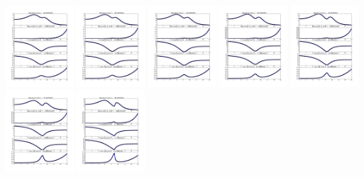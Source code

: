 \documentclass[11pt]{article}
\begin{document}
\vskip 10pt 
\includegraphics[width=0.19\textwidth]{frame0055fig1.png}
\vskip 10pt 
\includegraphics[width=0.19\textwidth]{frame0056fig1.png}
\vskip 10pt 
\includegraphics[width=0.19\textwidth]{frame0057fig1.png}
\vskip 10pt 
\includegraphics[width=0.19\textwidth]{frame0058fig1.png}
\vskip 10pt 
\includegraphics[width=0.19\textwidth]{frame0059fig1.png}
\vskip 10pt 
\includegraphics[width=0.19\textwidth]{frame0060fig1.png}
\vskip 10pt 
\includegraphics[width=0.19\textwidth]{frame0061fig1.png}
\end{document}
